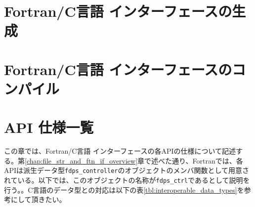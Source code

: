 \documentclass[12pt,a4paper,dvipdfmx]{jbook} %
\begin{document}
\chapter{Fortran/C言語 インターフェースの生成}
\label{chap:script_spec}

\newpage

\chapter{Fortran/C言語 インターフェースのコンパイル}
\label{chap:compile_and_macro}

\newpage

\chapter{API 仕様一覧}
\label{chap:API_spec_list}
この章では、Fortran/C言語 インターフェースの各APIの仕様について記述する。第\ref{chap:file_str_and_ftn_if_overview}章で述べた通り、Fortranでは、各APIは派生データ型\texttt{fdps\_controller}のオブジェクトのメンバ関数として用意されている。以下では、このオブジェクトの名称が\texttt{fdps\_ctrl}であるとして説明を行う。{\setnoko{}}。C言語のデータ型との対応は以下の表\ref{tbl:interoperable_data_types}を参考にして頂きたい。
\clearpage
\end{document}
